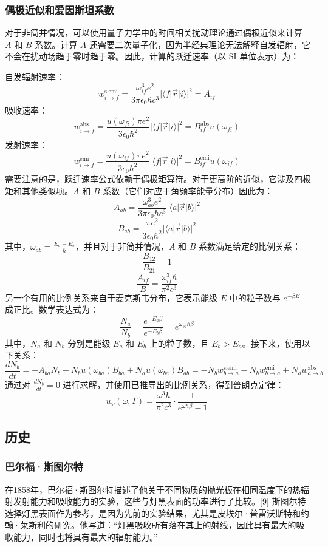 \subsubsection{偶极近似和爱因斯坦系数}
对于非简并情况，可以使用量子力学中的时间相关扰动理论通过偶极近似来计算 \( A \) 和 \( B \) 系数。计算 \( A \) 还需要二次量子化，因为半经典理论无法解释自发辐射，它不会在扰动场趋于零时趋于零。因此，计算的跃迁速率（以 SI 单位表示）为：

自发辐射速率：
\[
w_{i\rightarrow f}^{\text{s.emi}} = \frac{\omega_{if}^3 e^2}{3\pi \epsilon_0 \hbar c^3} |\langle f| \vec{r} | i \rangle|^2 = A_{if}~
\]
吸收速率：
\[
w_{i\rightarrow f}^{\text{abs}} = \frac{u(\omega_{fi}) \pi e^2}{3\epsilon_0 \hbar^2} |\langle f| \vec{r} | i \rangle|^2 = B_{if}^{\text{abs}} u(\omega_{fi})~
\]
发射速率：
\[
w_{i\rightarrow f}^{\text{emi}} = \frac{u(\omega_{if}) \pi e^2}{3\epsilon_0 \hbar^2} |\langle f| \vec{r} | i \rangle|^2 = B_{if}^{\text{emi}} u(\omega_{if})~
\]
需要注意的是，跃迁速率公式依赖于偶极矩算符。对于更高阶的近似，它涉及四极矩和其他类似项。\( A \) 和 \( B \) 系数（它们对应于角频率能量分布）因此为：
\[
A_{ab} = \frac{\omega_{ab}^3 e^2}{3\pi \epsilon_0 \hbar c^3} |\langle a| \vec{r} | b \rangle |^2~
\]
\[
B_{ab} = \frac{\pi e^2}{3\epsilon_0 \hbar^2} |\langle a| \vec{r} | b \rangle |^2~
\]
其中，\(\omega_{ab} = \frac{E_a - E_b}{\hbar}\)，并且对于非简并情况，\( A \) 和 \( B \) 系数满足给定的比例关系：
\[
\frac{B_{12}}{B_{21}} = 1~
\]
\[
\frac{A_{if}}{B} = \frac{\omega_{if}^3 \hbar}{\pi^2 c^3}~
\]
另一个有用的比例关系来自于麦克斯韦分布，它表示能级 \( E \) 中的粒子数与 \( e^{-\beta E} \) 成正比。数学表达式为：
\[
\frac{N_a}{N_b} = \frac{e^{-E_a \beta}}{e^{-E_b \beta}} = e^{\omega_{ba} \hbar \beta}~
\]
其中，\( N_a \) 和 \( N_b \) 分别是能级 \( E_a \) 和 \( E_b \) 上的粒子数，且 \( E_b > E_a \)。接下来，使用以下关系：
\[
\frac{dN_b}{dt} = -A_{ba} N_b - N_b u(\omega_{ba}) B_{ba} + N_a u(\omega_{ba}) B_{ab} = -N_b w_{b \rightarrow a}^{\text{s.emi}} - N_b w_{b \rightarrow a}^{\text{emi}} + N_a w_{a \rightarrow b}^{\text{abs}}~
\]
通过对 \( \frac{dN_b}{dt} = 0 \) 进行求解，并使用已推导出的比例关系，得到普朗克定律：
\[
u_{\omega}(\omega, T) = \frac{\omega^3 \hbar}{\pi^2 c^3} \cdot \frac{1}{e^{\omega \hbar \beta} - 1}~
\]
\subsection{历史}
\subsubsection{巴尔福·斯图尔特}
在1858年，巴尔福·斯图尔特描述了他关于不同物质的抛光板在相同温度下的热辐射发射能力和吸收能力的实验，这些与灯黑表面的功率进行了比较。[9] 斯图尔特选择灯黑表面作为参考，是因为先前的实验结果，尤其是皮埃尔·普雷沃斯特和约翰·莱斯利的研究。他写道：“灯黑吸收所有落在其上的射线，因此具有最大的吸收能力，同时也将具有最大的辐射能力。”

